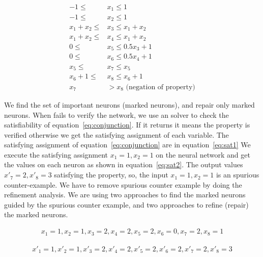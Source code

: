 \begin{equation}
    \begin{aligned}
        -1 \leq & x_1 \leq 1 \\ 
        -1 \leq & x_2 \leq 1 \\
         x_1 + x_2 \leq & x_3 \leq x_1 + x_2 \\
         x_1 + x_2 \leq & x_4 \leq x_1 + x_2 \\
         0 \leq & x_5 \leq 0.5x_3+1 \\ 
         0 \leq & x_6 \leq 0.5x_4 + 1 \\
         x_5 \leq & x_7 \leq x_5 \\ 
         x_6+1 \leq & x_8 \leq x_6+1 \\
         x_7 & > x_8 \text{ (negation of property)}
    \end{aligned}
\label{eq:conjunction}
\end{equation}

We find the set of important neurons (marked neurons), and repair only marked neurons. 
When \deeppoly{} fails to verify the network, we use an \milp{} solver to check the satisfiability
of equation~\ref{eq:conjunction}. 
If it returns \unsat{} it means the property is verified otherwise we get the satisfying assignment of each variable. 
The satisfying assignment of equation~\ref{eq:conjunction} are in equation~\ref{eq:sat1}
We execute the satisfying assignment $x_1=1,x_2=1$ on the neural network and get the values on each neuron 
as shown in equation~\ref{eq:sat2}. 
The output values $x'_7=2, x'_8=3$ satisfying the property, so, the input $x_1=1, x_2=1$ is an spurious counter-example. 
We have to remove spurious counter example by doing the refinement analysis. 
We are using two approaches to find the marked neurons guided by the spurious counter example, 
and two approaches to refine (repair) the marked neurons.

\begin{equation}
    \begin{aligned}
        x_1=1, x_2=1, x_3=2, x_4=2, x_5=2, x_6=0, x_7=2, x_8=1
    \end{aligned}
\label{eq:sat1}
\end{equation}

\begin{equation}
    \begin{aligned}
        x'_1=1, x'_2=1, x'_3=2, x'_4=2, x'_5=2, x'_6=2, x'_7=2, x'_8=3
    \end{aligned}
\label{eq:sat2}
\end{equation}





